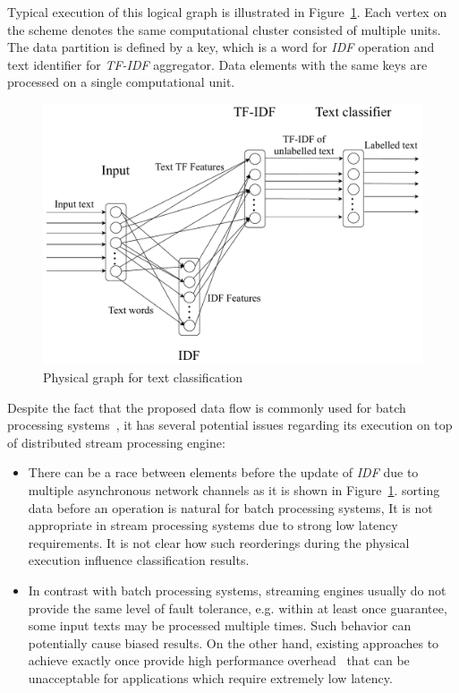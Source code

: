 Typical execution of this logical graph is illustrated in Figure~\ref{physical_graph}. Each vertex on the scheme denotes the same computational cluster consisted of multiple units. The data partition is defined by a key, which is a word for {\em IDF} operation and text identifier for {\em TF-IDF} aggregator. Data elements with the same keys are processed on a single computational unit.

\begin{figure}[htbp]
  \centering
  \includegraphics[scale=0.375]{pics/physical-graph-no-part-fit}
  \caption{Physical graph for text classification}
  \label {physical_graph}
\end{figure}

Despite the fact that the proposed data flow is commonly used for batch processing systems~\cite{semberecki2016distributed}, it has several potential issues regarding its execution on top of distributed stream processing engine:

\begin{itemize}
    \item There can be a race between elements before the update of {\em IDF} due to multiple asynchronous network channels as it is shown in Figure~\ref{physical_graph}. 
     sorting data before an operation is natural for batch processing systems,     It  is not appropriate in stream processing systems      due to strong low latency requirements.
    It is  not    clear how such reorderings during the physical execution influence classification results.
    
    \item 
    In contrast with batch processing systems, streaming engines usually do not provide the same level of fault tolerance, e.g. within at least once guarantee, some input texts may be processed multiple times. Such behavior can potentially cause biased results. On the other hand, existing approaches to achieve exactly once provide high performance overhead~\cite{we2018beyondmr} that can be unacceptable for applications which require extremely low latency.
\end{itemize}